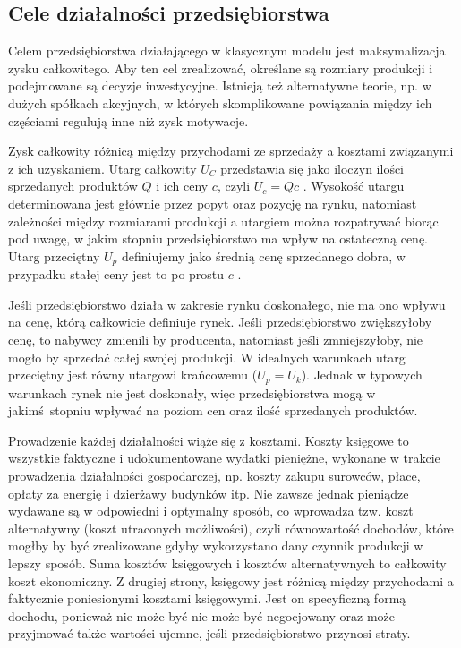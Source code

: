 \documentclass[12pt]{extarticle}
\begin{document}
\subsection{Cele działalności przedsiębiorstwa}

Celem przedsiębiorstwa działającego w klasycznym modelu jest maksymalizacja zysku całkowitego. Aby ten cel zrealizować, określane są rozmiary produkcji i podejmowane są decyzje inwestycyjne. Istnieją też alternatywne teorie, np. w dużych spółkach akcyjnych, w których skomplikowane powiązania między ich częściami regulują inne niż zysk motywacje. 

Zysk całkowity różnicą między przychodami ze sprzedaży a kosztami związanymi z ich uzyskaniem. Utarg całkowity $ U_C $ przedstawia się jako iloczyn ilości sprzedanych produktów $ Q $ i ich ceny $ c $, czyli $ U_c = Qc $ . Wysokość utargu determinowana jest głównie przez popyt oraz pozycję na rynku, natomiast zależności między rozmiarami produkcji a utargiem można rozpatrywać biorąc pod uwagę, w jakim stopniu przedsiębiorstwo ma wpływ na ostateczną cenę. Utarg przeciętny $ U_p $ definiujemy jako średnią cenę sprzedanego dobra, w przypadku stałej ceny jest to po prostu $ c $ .

Jeśli przedsiębiorstwo działa w zakresie rynku doskonałego, nie ma ono wpływu na cenę, którą całkowicie definiuje rynek. Jeśli przedsiębiorstwo zwiększyłoby cenę, to nabywcy zmienili by producenta, natomiast jeśli zmniejszyłoby, nie mogło by sprzedać całej swojej produkcji. W idealnych warunkach utarg przeciętny jest równy utargowi krańcowemu ($ U_p = U_k $). Jednak w typowych warunkach rynek nie jest doskonały, więc przedsiębiorstwa mogą w jakimś stopniu wpływać na poziom cen oraz ilość sprzedanych produktów.

Prowadzenie każdej działalności wiąże się z kosztami. Koszty księgowe to wszystkie faktyczne i udokumentowane wydatki pieniężne, wykonane w trakcie prowadzenia działalności gospodarczej, np. koszty zakupu surowców, płace, opłaty za energię i dzierżawy budynków itp. Nie zawsze jednak pieniądze wydawane są w odpowiedni i optymalny sposób, co wprowadza tzw. koszt alternatywny (koszt utraconych możliwości), czyli równowartość dochodów, które mogłby by być zrealizowane gdyby wykorzystano dany czynnik produkcji w lepszy sposób. Suma kosztów księgowych i kosztów alternatywnych to całkowity koszt ekonomiczny. Z drugiej strony, księgowy jest różnicą między przychodami a faktycznie poniesionymi kosztami księgowymi. Jest on specyficzną formą dochodu, ponieważ nie może być nie może być negocjowany oraz może przyjmować także wartości ujemne, jeśli przedsiębiorstwo przynosi straty.
\end{document}
